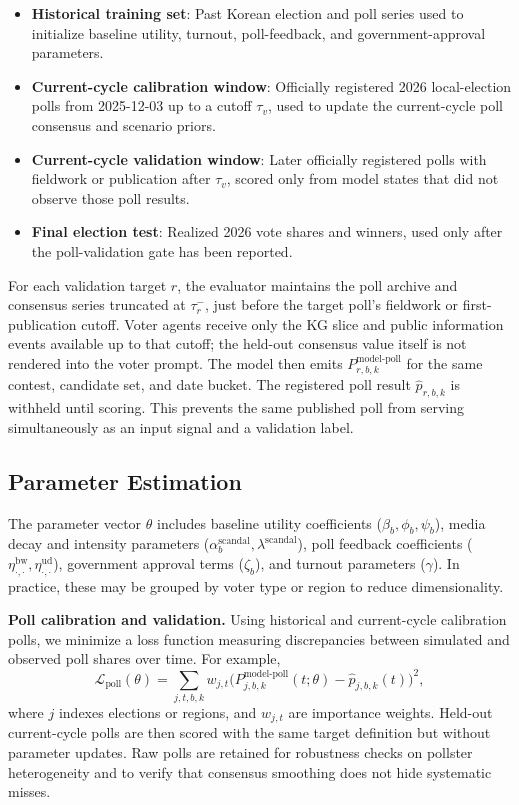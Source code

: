 \documentclass[11pt]{article}
\begin{document}
\begin{itemize}
  \item \textbf{Historical training set}: Past Korean election and poll series used to initialize baseline utility, turnout, poll-feedback, and government-approval parameters.
  \item \textbf{Current-cycle calibration window}: Officially registered 2026 local-election polls from 2025-12-03 up to a cutoff $\tau_v$, used to update the current-cycle poll consensus and scenario priors.
  \item \textbf{Current-cycle validation window}: Later officially registered polls with fieldwork or publication after $\tau_v$, scored only from model states that did not observe those poll results.
  \item \textbf{Final election test}: Realized 2026 vote shares and winners, used only after the poll-validation gate has been reported.
\end{itemize}

For each validation target $r$, the evaluator maintains the poll archive and consensus series truncated at $\tau_r^-$, just before the target poll's fieldwork or first-publication cutoff. Voter agents receive only the KG slice and public information events available up to that cutoff; the held-out consensus value itself is not rendered into the voter prompt. The model then emits $P^{\text{model-poll}}_{r,b,k}$ for the same contest, candidate set, and date bucket. The registered poll result $\hat p_{r,b,k}$ is withheld until scoring. This prevents the same published poll from serving simultaneously as an input signal and a validation label.

\subsection{Parameter Estimation}

The parameter vector $\theta$ includes baseline utility coefficients ($\beta_b, \phi_b, \psi_b$), media decay and intensity parameters ($\alpha^{\text{scandal}}_b, \lambda^{\text{scandal}}$), poll feedback coefficients ($\eta^{\text{bw}}_{\cdot,\cdot}, \eta^{\text{ud}}_{\cdot,\cdot}$), government approval terms ($\zeta_b$), and turnout parameters ($\gamma$). In practice, these may be grouped by voter type or region to reduce dimensionality.

\textbf{Poll calibration and validation.} Using historical and current-cycle calibration polls, we minimize a loss function measuring discrepancies between simulated and observed poll shares over time. For example,
\begin{equation}
\mathcal{L}_{\text{poll}}(\theta) = \sum_{j,t,b,k} w_{j,t} \Big(P^{\text{model-poll}}_{j,b,k}(t; \theta) - \hat p_{j,b,k}(t)\Big)^2,
\end{equation}
where $j$ indexes elections or regions, and $w_{j,t}$ are importance weights. Held-out current-cycle polls are then scored with the same target definition but without parameter updates. Raw polls are retained for robustness checks on pollster heterogeneity and to verify that consensus smoothing does not hide systematic misses.
\end{document}
